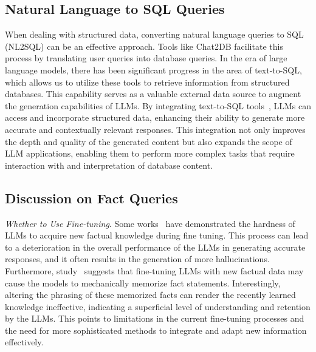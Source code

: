 \subsection{Natural Language to SQL Queries}
When dealing with structured data, converting natural language queries to SQL (NL2SQL) can be an effective approach. Tools like Chat2DB facilitate this process by translating user queries into database queries. In the era of large language models, there has been significant progress in the area of text-to-SQL\cite{shi2022xricl, li2023resdsql, poesia2022synchromesh, lin2020bridging}, which allows us to utilize these tools to retrieve information from structured databases. This capability serves as a valuable external data source to augment the generation capabilities of LLMs. By integrating text-to-SQL tools~\cite{biswal2024text2sql}, LLMs can access and incorporate structured data, enhancing their ability to generate more accurate and contextually relevant responses. This integration not only improves the depth and quality of the generated content but also expands the scope of LLM applications, enabling them to perform more complex tasks that require interaction with and interpretation of database content.

\subsection{Discussion on Fact Queries}
\textit{Whether to Use Fine-tuning}. Some works~\cite{fine_tune_new_24} have demonstrated the hardness of LLMs to acquire new factual knowledge during fine tuning. This process can lead to a deterioration in the overall performance of the LLMs in generating accurate responses, and it often results in the generation of more hallucinations. Furthermore, study~\cite{berglund2023reversal} suggests that fine-tuning LLMs with new factual data may cause the models to mechanically memorize fact statements. Interestingly, altering the phrasing of these memorized facts can render the recently learned knowledge ineffective, indicating a superficial level of understanding and retention by the LLMs. This points to limitations in the current fine-tuning processes and the need for more sophisticated methods to integrate and adapt new information effectively.

